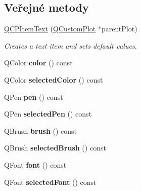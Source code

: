 \subsection*{Veřejné metody}
\begin{DoxyCompactItemize}
\item 
\hyperlink{classQCPItemText_a77ff96a2972a00872ff8f8c67143abbe}{Q\+C\+P\+Item\+Text} (\hyperlink{classQCustomPlot}{Q\+Custom\+Plot} $\ast$parent\+Plot)
\begin{DoxyCompactList}\small\item\em Creates a text item and sets default values. \end{DoxyCompactList}\item 
\hypertarget{classQCPItemText_ac9cb0a8a27f64d1b40855910ea9ebd03}{}Q\+Color {\bfseries color} () const \label{classQCPItemText_ac9cb0a8a27f64d1b40855910ea9ebd03}

\item 
\hypertarget{classQCPItemText_a44f690ec0ba6a32e518f2e923c002e39}{}Q\+Color {\bfseries selected\+Color} () const \label{classQCPItemText_a44f690ec0ba6a32e518f2e923c002e39}

\item 
\hypertarget{classQCPItemText_a552bd02f46dbcb4b4812559036893352}{}Q\+Pen {\bfseries pen} () const \label{classQCPItemText_a552bd02f46dbcb4b4812559036893352}

\item 
\hypertarget{classQCPItemText_a70c86ec95133d3e904d1718023fe3c4e}{}Q\+Pen {\bfseries selected\+Pen} () const \label{classQCPItemText_a70c86ec95133d3e904d1718023fe3c4e}

\item 
\hypertarget{classQCPItemText_a38b981dfacb703efa8e27346eebcb5a2}{}Q\+Brush {\bfseries brush} () const \label{classQCPItemText_a38b981dfacb703efa8e27346eebcb5a2}

\item 
\hypertarget{classQCPItemText_ac6802bbceff1ade0053166c64a5a6966}{}Q\+Brush {\bfseries selected\+Brush} () const \label{classQCPItemText_ac6802bbceff1ade0053166c64a5a6966}

\item 
\hypertarget{classQCPItemText_ad34943fd68a9b1451d3e3234d072e418}{}Q\+Font {\bfseries font} () const \label{classQCPItemText_ad34943fd68a9b1451d3e3234d072e418}

\item 
\hypertarget{classQCPItemText_af2e7cacb1975132508714a51c5f48c3b}{}Q\+Font {\bfseries selected\+Font} () const \label{classQCPItemText_af2e7cacb1975132508714a51c5f48c3b}


\end{DoxyCompactItemize}
